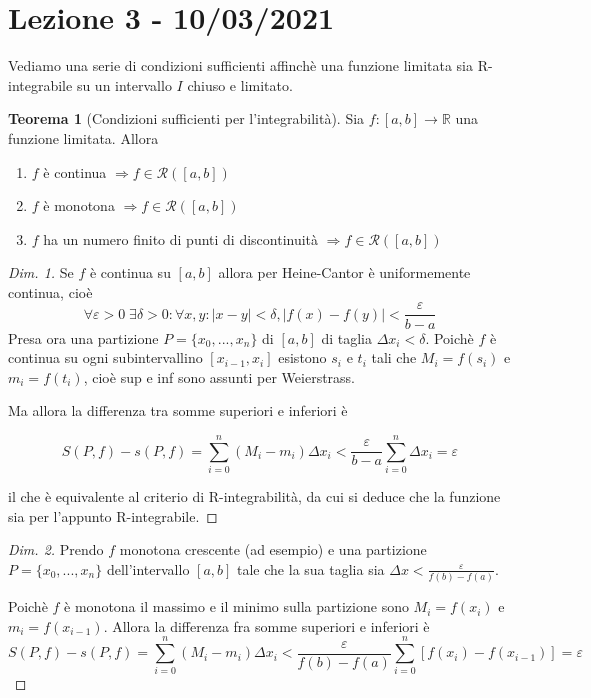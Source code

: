 \documentclass{article}
\theoremstyle{definition}
\newtheorem{theorem}{Teorema}[section]
\theoremstyle{definition}
\theoremstyle{definition}
\theoremstyle{definition}
\theoremstyle{definition}
\theoremstyle{definition}
\begin{document}
\newpage
\section{Lezione 3 - 10/03/2021}

Vediamo una serie di condizioni sufficienti affinchè una funzione limitata sia R-integrabile su un intervallo $I$ chiuso e limitato.

\begin{theorem}[Condizioni sufficienti per l'integrabilità]
    Sia $f:[a,b]\rightarrow \mathbb{R}$ una funzione limitata. Allora
    \begin{enumerate}
        \item $f$ è continua $\Rightarrow f \in \mathcal{R}([a,b])$
        \item $f$ è monotona $\Rightarrow f \in \mathcal{R}([a,b])$
        \item $f$ ha un numero finito di punti di discontinuità $\Rightarrow f \in \mathcal{R}([a,b])$
    \end{enumerate}
    
    \begin{proof}[Dim. 1]
        Se $f$ è continua su $[a,b]$ allora per Heine-Cantor è uniformemente continua, cioè
        \[
        \forall \varepsilon > 0 \; \exists \delta>0: \forall x,y: \left|x-y \right| < \delta, \left|f(x)-f(y)\right| < \frac{\varepsilon}{b-a}
        \]
        Presa ora una partizione $P=\lbrace x_0,...,x_n \rbrace$ di $[a,b]$ di taglia $\Delta x_i < \delta$. Poichè $f$ è continua su ogni subintervallino $[x_{i-1}, x_i]$ esistono $s_i$ e $t_i$ tali che $M_i=f(s_i)$ e $m_i=f(t_i)$, cioè sup e inf sono assunti per Weierstrass. 

        Ma allora la differenza tra somme superiori e inferiori è

        \[
        S(P,f) - s(P,f) = \displaystyle\sum_{i=0}^{n} (M_i-m_i)\Delta x_i < \frac{\varepsilon}{b-a}\displaystyle\sum_{i=0}^{n} \Delta x_i = \varepsilon
        \]  

        il che è equivalente al criterio di R-integrabilità, da cui si deduce che la funzione sia per l'appunto R-integrabile.
    \end{proof}
    \begin{proof}[Dim. 2]
        Prendo $f$ monotona crescente (ad esempio) e una partizione $P=\lbrace x_0,...,x_n \rbrace$ dell'intervallo $[a,b]$ tale che la sua taglia sia $\Delta x < \frac{\varepsilon}{f(b)-f(a)}$.

        Poichè $f$ è monotona il massimo e il minimo sulla partizione sono $M_i=f(x_i)$ e $m_i=f(x_{i-1})$. Allora la differenza fra somme superiori e inferiori è \[S(P,f) - s(P,f) = \sum_{i=0}^{n}(M_i-m_i)\Delta x_i < \frac{\varepsilon}{f(b)-f(a)} \sum_{i=0}^{n}[f(x_i)-f(x_{i-1})] = \varepsilon\]


\end{proof}
\end{theorem}
\end{document}
